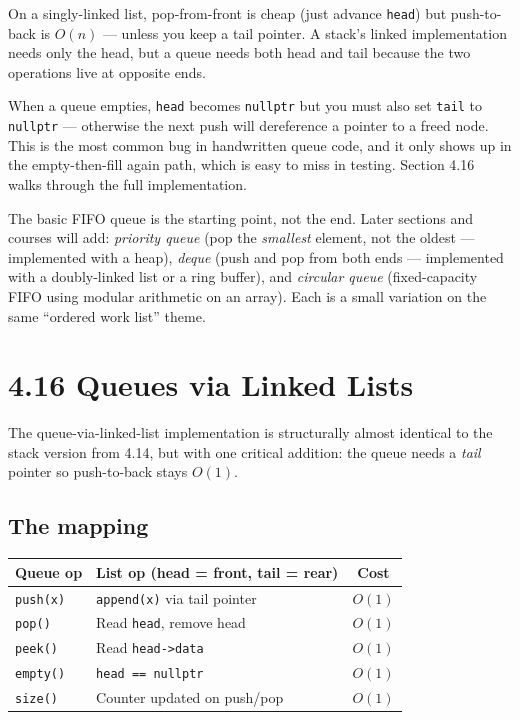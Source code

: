 \documentclass[11pt]{article}
\begin{document}
On a singly-linked list, pop-from-front is cheap (just advance
\texttt{head}) but push-to-back is $O(n)$ --- unless you keep a
tail pointer. A stack's linked implementation needs only the
head, but a queue needs both head and tail because the two
operations live at opposite ends.

\begin{warnbox}
When a queue empties, \texttt{head} becomes \texttt{nullptr} but
you must also set \texttt{tail} to \texttt{nullptr} --- otherwise
the next push will dereference a pointer to a freed node. This
is the most common bug in handwritten queue code, and it only
shows up in the empty-then-fill again path, which is easy to
miss in testing. Section 4.16 walks through the full
implementation.
\end{warnbox}

\begin{ideabox}
The basic FIFO queue is the starting point, not the end. Later
sections and courses will add: \emph{priority queue} (pop the
\emph{smallest} element, not the oldest --- implemented with a
heap), \emph{deque} (push and pop from both ends --- implemented
with a doubly-linked list or a ring buffer), and \emph{circular
queue} (fixed-capacity FIFO using modular arithmetic on an
array). Each is a small variation on the same ``ordered work
list'' theme.
\end{ideabox}

\section{4.16 Queues via Linked Lists}

The queue-via-linked-list implementation is structurally almost
identical to the stack version from 4.14, but with one critical
addition: the queue needs a \emph{tail} pointer so push-to-back
stays $O(1)$.

\subsection*{The mapping}

\begin{center}
\begin{tabular}{|l|l|c|}
\hline
\textbf{Queue op} & \textbf{List op (head = front, tail = rear)} & \textbf{Cost} \\
\hline
\texttt{push(x)}  & \texttt{append(x)} via tail pointer & $O(1)$ \\
\texttt{pop()}    & Read \texttt{head}, remove head    & $O(1)$ \\
\texttt{peek()}   & Read \texttt{head->data}           & $O(1)$ \\
\texttt{empty()}  & \texttt{head == nullptr}           & $O(1)$ \\
\texttt{size()}   & Counter updated on push/pop        & $O(1)$ \\
\hline
\end{tabular}
\end{center}
\end{document}
